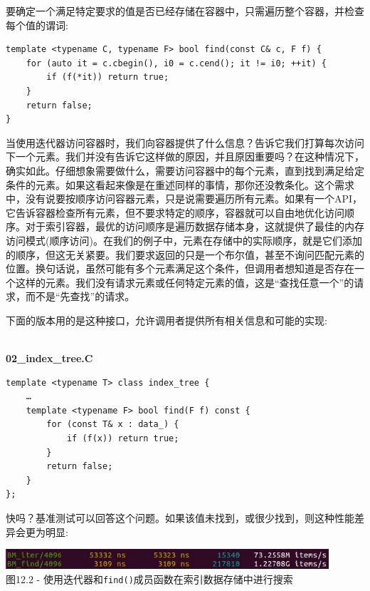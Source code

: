 要确定一个满足特定要求的值是否已经存储在容器中，只需遍历整个容器，并检查每个值的谓词:

\begin{lstlisting}[style=styleCXX]
template <typename C, typename F> bool find(const C& c, F f) {
	for (auto it = c.cbegin(), i0 = c.cend(); it != i0; ++it) {
		if (f(*it)) return true;
	}
	return false;
}
\end{lstlisting}

当使用迭代器访问容器时，我们向容器提供了什么信息？告诉它我们打算每次访问下一个元素。我们并没有告诉它这样做的原因，并且原因重要吗？在这种情况下，确实如此。仔细想象需要做什么，需要访问容器中的每个元素，直到找到满足给定条件的元素。如果这看起来像是在重述同样的事情，那你还没教条化。这个需求中，没有说要按顺序访问容器元素，只是说需要遍历所有元素。如果有一个API，它告诉容器检查所有元素，但不要求特定的顺序，容器就可以自由地优化访问顺序。对于索引容器，最优的访问顺序是遍历数据存储本身，这就提供了最佳的内存访问模式(顺序访问)。在我们的例子中，元素在存储中的实际顺序，就是它们添加的顺序，但这无关紧要。我们要求返回的只是一个布尔值，甚至不询问匹配元素的位置。换句话说，虽然可能有多个元素满足这个条件，但调用者想知道是否存在一个这样的元素。我们没有请求元素或任何特定元素的值，这是“查找任意一个”的请求，而不是“先查找”的请求。 

下面的版本用的是这种接口，允许调用者提供所有相关信息和可能的实现:

\hspace*{\fill} \\ %
\noindent
\textbf{02\_index\_tree.C}
\begin{lstlisting}[style=styleCXX]
template <typename T> class index_tree {
	…
	template <typename F> bool find(F f) const {
		for (const T& x : data_) {
			if (f(x)) return true;
		}
		return false;
	}
};
\end{lstlisting}

快吗？基准测试可以回答这个问题。如果该值未找到，或很少找到，则这种性能差异会更为明显:

\begin{center}
\includegraphics[width=0.9\textwidth]{content/3/chapter12/images/2.jpg}\\
图12.2 - 使用迭代器和\texttt{find()}成员函数在索引数据存储中进行搜索
\end{center}

